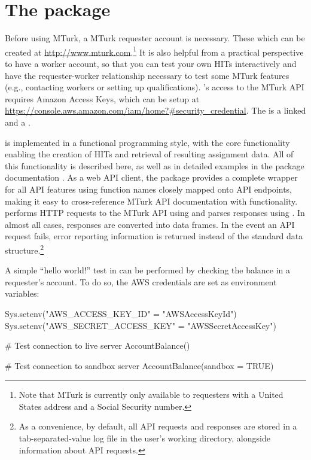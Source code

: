 \section[The MTurkR package]{The  package}
Before using MTurk, a MTurk requester account is necessary. These
which can be created at \url{http://www.mturk.com}.\footnote{Note that
  MTurk is currently only available to requesters with a United States
  address and a Social Security number.} It is also helpful from a
practical perspective to have a worker account, so that you can test
your own HITs interactively and have the requester-worker relationship
necessary to test some MTurk features (e.g., contacting workers or
setting up qualifications). 's access to the MTurk API
requires Amazon Access Keys, which can be setup at
\url{https://console.aws.amazon.com/iam/home?#security_credential}. The
 is a linked  and a .

 is implemented in a functional programming style, with
the core functionality enabling the creation of HITs and retrieval of
resulting assignment data. All of this functionality is described
here, as well as in detailed examples in the  package
documentation \citep{Leeper2012c}. As a web API client, the package
provides a complete wrapper for all API features using function names
closely mapped onto API endpoints, making it easy to cross-reference
MTurk API documentation with  functionality. 
performs HTTP requests to the MTurk API using 
\citep{Ooms2015} and parses responses using 
\citep{TempleLang2012b}. In almost all cases, responses are converted
into data frames. In the event an API request fails, error reporting
information is returned instead of the standard data
structure.\footnote{As a convenience, by default, all API requests and responses
  are stored in a tab-separated-value log file in the
  user's working directory, alongside information about API requests.}

A simple ``hello world!'' test in  can be performed by checking the balance in a requester's account. To do so, the AWS credentials are set as environment variables:

\begin{example}
Sys.setenv("AWS_ACCESS_KEY_ID" = "AWSAccessKeyId")
Sys.setenv("AWS_SECRET_ACCESS_KEY" = "AWSSecretAccessKey")

# Test connection to live server
AccountBalance()

# Test connection to sandbox server
AccountBalance(sandbox = TRUE)
\end{example}

